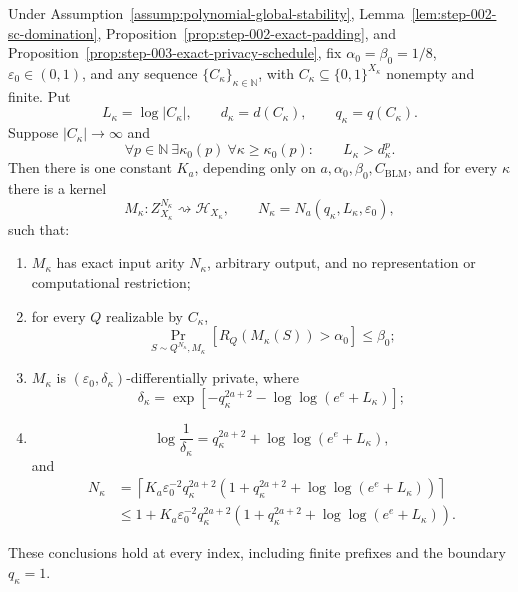 \begin{proposition}
\label{prop:step-006-sequence-learners}
Under Assumption~\ref{assump:polynomial-global-stability},
Lemma~\ref{lem:step-002-sc-domination},
Proposition~\ref{prop:step-002-exact-padding}, and
Proposition~\ref{prop:step-003-exact-privacy-schedule}, fix
\(\alpha_0=\beta_0=1/8\), \(\varepsilon_0\in(0,1)\), and any sequence
\(\{C_\kappa\}_{\kappa\in\mathbb N}\), with
\(C_\kappa\subseteq\{0,1\}^{X_\kappa}\) nonempty and finite.  Put
\[
L_\kappa=\log|C_\kappa|,\qquad
d_\kappa=d(C_\kappa),\qquad q_\kappa=q(C_\kappa).
\]
Suppose \(|C_\kappa|\to\infty\) and
\[
\forall p\in\mathbb N\ \exists\kappa_0(p)\
\forall\kappa\geq\kappa_0(p):
\qquad L_\kappa>d_\kappa^p.
\]
Then there is one constant \(K_a\),
depending only on \(a,\alpha_0,\beta_0,C_{\mathrm{BLM}}\), and for
every \(\kappa\) there is a kernel
\begin{equation}
M_\kappa:
Z_{X_\kappa}^{N_\kappa}
\rightsquigarrow\mathcal H_{X_\kappa},
\qquad
N_\kappa=N_a(q_\kappa,L_\kappa,\varepsilon_0),
\label{eq:app-a111}
\end{equation}
such that:
\begin{enumerate}[label=(\roman*)]
\item \(M_\kappa\) has exact input arity \(N_\kappa\), arbitrary
output, and no representation or computational restriction;
\item for every \(Q\) realizable by \(C_\kappa\),
\begin{equation}
\Pr_{S\sim Q^{N_\kappa},M_\kappa}
[R_Q(M_\kappa(S))>\alpha_0]\leq\beta_0;
\label{eq:app-a112}
\end{equation}
\item \(M_\kappa\) is
\((\varepsilon_0,\delta_\kappa)\)-differentially private, where
\begin{equation}
\delta_\kappa
=\exp[-q_\kappa^{2a+2}
-\log\log(e^e+L_\kappa)];
\label{eq:app-a113}
\end{equation}
\item
\begin{equation}
\log\frac1{\delta_\kappa}
=q_\kappa^{2a+2}+\log\log(e^e+L_\kappa),
\label{eq:app-a114}
\end{equation}
and
\begin{equation}
\begin{aligned}
N_\kappa
&=
\left\lceil
K_a\varepsilon_0^{-2}q_\kappa^{2a+2}
\left(
1+q_\kappa^{2a+2}
+\log\log(e^e+L_\kappa)
\right)
\right\rceil\\
&\leq
1+K_a\varepsilon_0^{-2}q_\kappa^{2a+2}
\left(
1+q_\kappa^{2a+2}
+\log\log(e^e+L_\kappa)
\right).
\end{aligned}
\label{eq:app-a115}
\end{equation}
\end{enumerate}
These conclusions hold at every index, including finite prefixes and
the boundary \(q_\kappa=1\).
\end{proposition}

